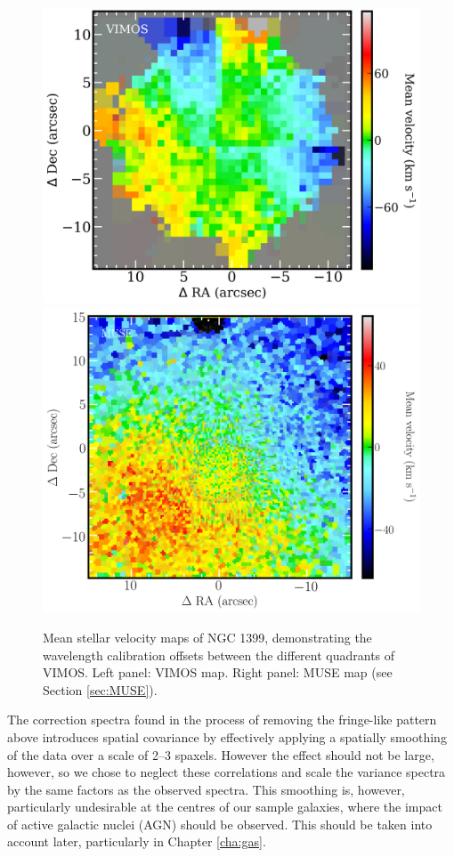 		\begin{figure}
			\centering
			\includegraphics[width=.4\textwidth]{chapter2/VIMOS_NGC1399_vel.png}
			\includegraphics[width=.4\textwidth]{chapter2/MUSE_NGC1399_vel.png}
			\caption[VIMOS data wavelength calibration problems]{Mean stellar velocity maps of NGC 1399, demonstrating the wavelength calibration offsets between the different quadrants of VIMOS. Left panel: VIMOS map. Right panel: MUSE map (see Section \ref{sec:MUSE}).}
			\label{fig:egVel}
		\end{figure}

		The correction spectra found in the process of removing the fringe-like pattern above introduces spatial covariance by effectively applying a spatially smoothing of the data over a scale of 2--3 spaxels. However the effect should not be large, however, so we chose to neglect these correlations and scale the variance spectra by the same factors as the observed spectra. This smoothing is, however, particularly undesirable at the centres of our sample galaxies, where the impact of active galactic nuclei (AGN) should be observed. This should be taken into account later, particularly in Chapter \ref{cha:gas}.


